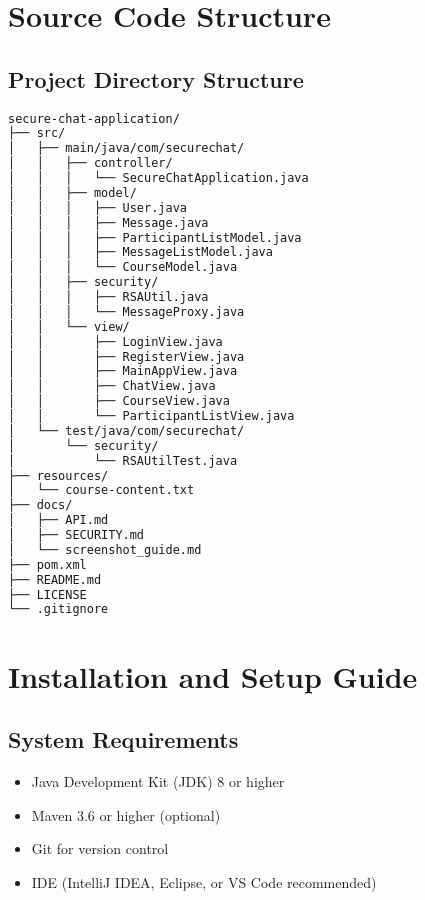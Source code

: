 \documentclass[12pt,a4paper]{article}
\begin{document}
\newpage

\appendix

\section{Source Code Structure}

\subsection{Project Directory Structure}

\begin{lstlisting}[language=bash, caption=Complete Project Structure]
secure-chat-application/
├── src/
│   ├── main/java/com/securechat/
│   │   ├── controller/
│   │   │   └── SecureChatApplication.java
│   │   ├── model/
│   │   │   ├── User.java
│   │   │   ├── Message.java
│   │   │   ├── ParticipantListModel.java
│   │   │   ├── MessageListModel.java
│   │   │   └── CourseModel.java
│   │   ├── security/
│   │   │   ├── RSAUtil.java
│   │   │   └── MessageProxy.java
│   │   └── view/
│   │       ├── LoginView.java
│   │       ├── RegisterView.java
│   │       ├── MainAppView.java
│   │       ├── ChatView.java
│   │       ├── CourseView.java
│   │       └── ParticipantListView.java
│   └── test/java/com/securechat/
│       └── security/
│           └── RSAUtilTest.java
├── resources/
│   └── course-content.txt
├── docs/
│   ├── API.md
│   ├── SECURITY.md
│   └── screenshot_guide.md
├── pom.xml
├── README.md
├── LICENSE
└── .gitignore
\end{lstlisting}

\section{Installation and Setup Guide}

\subsection{System Requirements}

\begin{itemize}
    \item Java Development Kit (JDK) 8 or higher
    \item Maven 3.6 or higher (optional)
    \item Git for version control
    \item IDE (IntelliJ IDEA, Eclipse, or VS Code recommended)
\end{itemize}
\end{document}
